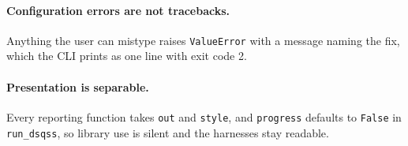 \documentclass[11pt,a4paper]{article}
\newcommand{\code}[1]{\texttt{#1}}
\begin{document}
\paragraph{Configuration errors are not tracebacks.} Anything the user can
mistype raises \code{ValueError} with a message naming the fix, which the CLI
prints as one line with exit code 2.

\paragraph{Presentation is separable.} Every reporting function takes
\code{out} and \code{style}, and \code{progress} defaults to \code{False} in
\code{run\_dsqss}, so library use is silent and the harnesses stay readable.
\end{document}
